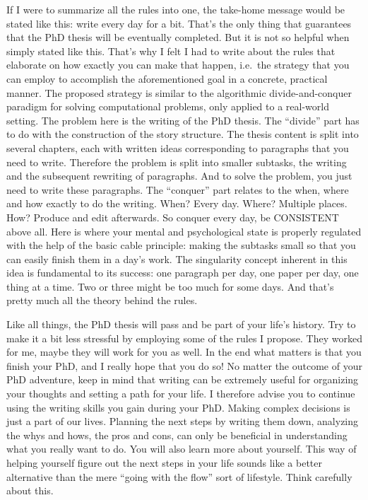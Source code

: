 \documentclass[
  12pt,
]{book}
\begin{document}
If I were to summarize all the rules into one, the take-home message would be stated like this: write every day for a bit.
That's the only thing that guarantees that the PhD thesis will be eventually completed.
But it is not so helpful when simply stated like this.
That's why I felt I had to write about the rules that elaborate on how exactly you can make that happen, i.e.~the strategy that you can employ to accomplish the aforementioned goal in a concrete, practical manner.
The proposed strategy is similar to the algorithmic divide-and-conquer paradigm for solving computational problems, only applied to a real-world setting.
The problem here is the writing of the PhD thesis.
The ``divide'' part has to do with the construction of the story structure.
The thesis content is split into several chapters, each with written ideas corresponding to paragraphs that you need to write.
Therefore the problem is split into smaller subtasks, the writing and the subsequent rewriting of paragraphs.
And to solve the problem, you just need to write these paragraphs.
The ``conquer'' part relates to the when, where and how exactly to do the writing.
When? Every day.
Where? Multiple places.
How? Produce and edit afterwards.
So conquer every day, be CONSISTENT above all.
Here is where your mental and psychological state is properly regulated with the help of the basic cable principle: making the subtasks small so that you can easily finish them in a day's work.
The singularity concept inherent in this idea is fundamental to its success: one paragraph per day, one paper per day, one thing at a time.
Two or three might be too much for some days.
And that's pretty much all the theory behind the rules.

Like all things, the PhD thesis will pass and be part of your life's history.
Try to make it a bit less stressful by employing some of the rules I propose.
They worked for me, maybe they will work for you as well.
In the end what matters is that you finish your PhD, and I really hope that you do so! No matter the outcome of your PhD adventure, keep in mind that writing can be extremely useful for organizing your thoughts and setting a path for your life.
I therefore advise you to continue using the writing skills you gain during your PhD.
Making complex decisions is just a part of our lives.
Planning the next steps by writing them down, analyzing the whys and hows, the pros and cons, can only be beneficial in understanding what you really want to do.
You will also learn more about yourself.
This way of helping yourself figure out the next steps in your life sounds like a better alternative than the mere ``going with the flow'' sort of lifestyle.
Think carefully about this.
\end{document}
